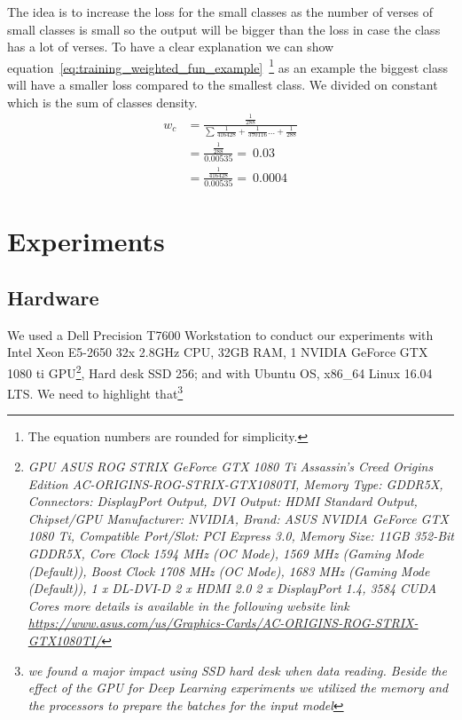 The idea is to increase the loss for the small classes as the number of verses of small classes is small so the output will be bigger than the loss in case the class has a lot of verses. To have a clear explanation we can show equation~\ref{eq:training_weighted_fun_example}~\footnote{The equation numbers are rounded for simplicity.} as an example the biggest class will have a smaller loss compared to the smallest class. We divided on constant which is the sum of classes density.%
\begin{subequations}
 \begin{align}
  w_c &= \frac{\frac{1}{288}}{\sum\frac{1}{416428}+\frac{1}{370116}\dots+\frac{1}{288}}\\
    &= \frac{\frac{1}{288}}{0.00535} = ~0.03 \\
    &= \frac{\frac{1}{416428}}{0.00535} = ~0.0004
 \end{align}\label{eq:training_weighted_fun_example}
\end{subequations}

\clearpage

\section{Experiments}

\subsection{Hardware}

We used a Dell Precision T7600 Workstation to conduct our experiments with Intel Xeon E5-2650 32x 2.8GHz CPU, 32GB RAM, 1 NVIDIA GeForce GTX 1080 ti GPU\footnote{\textit{GPU ASUS ROG STRIX GeForce GTX 1080 Ti Assassin's Creed Origins Edition AC-ORIGINS-ROG-STRIX-GTX1080TI, Memory Type: GDDR5X, Connectors: DisplayPort Output, DVI Output: HDMI Standard Output, Chipset/GPU Manufacturer: NVIDIA, Brand: ASUS NVIDIA GeForce GTX 1080 Ti, Compatible Port/Slot: PCI Express 3.0, Memory Size: 11GB 352-Bit GDDR5X, Core Clock 1594 MHz (OC Mode), 1569 MHz (Gaming Mode (Default)), Boost Clock 1708 MHz (OC Mode), 1683 MHz (Gaming Mode (Default)), 1 x DL-DVI-D 2 x HDMI 2.0 2 x DisplayPort 1.4, 3584 CUDA Cores more details is available in the following website link \url{https://www.asus.com/us/Graphics-Cards/AC-ORIGINS-ROG-STRIX-GTX1080TI/}} }, Hard desk SSD 256; and with Ubuntu OS, x86\_64 Linux 16.04 LTS. We need to highlight that\footnote{\textit{we found a major impact using SSD hard desk when data reading. Beside the effect of the GPU for Deep Learning experiments we utilized the memory and the processors to prepare the batches for the input model}}


